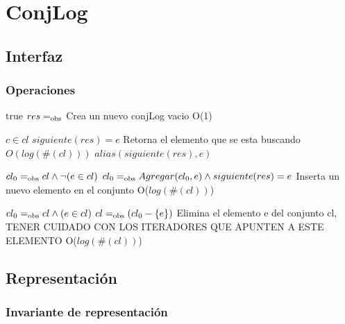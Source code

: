 \section{ConjLog}

\subsection{Interfaz}



\subsubsection*{Operaciones}

{true}
{$res \igobs \empty$}
{Crea un nuevo conjLog vacio}
{O(1)}
{}

{$c \in cl$}
{$siguiente(res) = e$}
{Retorna el elemento que se esta buscando}
{$O(log(\#(cl)))$}
{$alias(siguiente(res), e)$}

{$cl_0 =_{\mathrm{obs}} cl \land \neg(e \in cl)$}
{$cl_0 =_{\mathrm{obs}} Agregar(cl_0, e) \land siguiente(res)=e$}
{Inserta un nuevo elemento en el conjunto}
{O($log(\#(cl))$)}
{}

{$cl_0 =_{\mathrm{obs}} cl \land (e \in cl)$}
{$cl =_{\mathrm{obs}} (cl_0 - \{e\})$}
{Elimina el elemento e del conjunto cl, TENER CUIDADO CON LOS ITERADORES QUE APUNTEN A ESTE ELEMENTO}
{O($log(\#(cl))$)}

\subsection{Representación}


\newpage
\subsubsection*{Invariante de representación}


